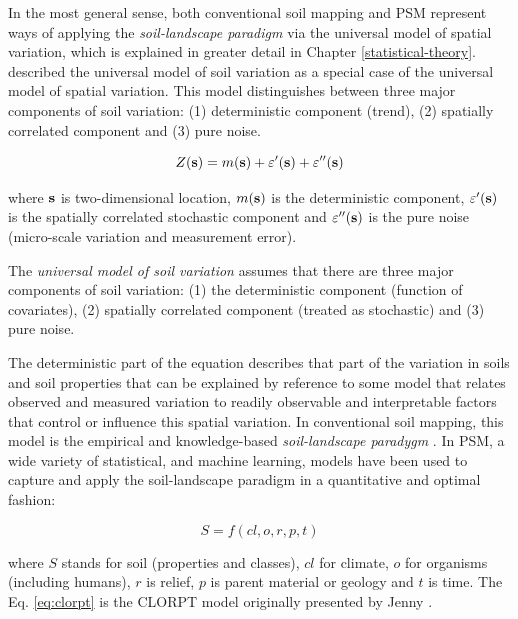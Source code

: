 \documentclass[11pt]{krantz}
\makeatletter
\newenvironment{kframe}{%
\medskip{}
\setlength{\fboxsep}{.8em}
 \def\at@end@of@kframe{}%
 \ifinner\ifhmode%
  \def\at@end@of@kframe{\end{minipage}}%
  \begin{minipage}{\columnwidth}%
 \fi\fi%
 \def\FrameCommand##1{\hskip\@totalleftmargin \hskip-\fboxsep
 \colorbox{shadecolor}{##1}\hskip-\fboxsep
     \hskip-\linewidth \hskip-\@totalleftmargin \hskip\columnwidth}%
 \MakeFramed {\advance\hsize-\width
   \@totalleftmargin\z@ \linewidth\hsize
   \@setminipage}}%
 {\par\unskip\endMakeFramed%
 \at@end@of@kframe}
\newenvironment{rmdblock}[1]
  {
  \begin{itemize}
  \renewcommand{\labelitemi}{
    \raisebox{-.7\height}[0pt][0pt]{
      {\setkeys{Gin}{width=3em,keepaspectratio}\texttt{[image: images/\#1]}}
    }
  }
  \setlength{\fboxsep}{1em}
  \begin{kframe}
  \item
  }
  {
  \end{kframe}
  \end{itemize}
  }
\newenvironment{rmdnote}
  {\begin{rmdblock}{note}}
  {\end{rmdblock}}
\theoremstyle{definition}
\theoremstyle{definition}
\theoremstyle{definition}
\theoremstyle{remark}
\makeatother
\begin{document}
In the most general sense, both conventional soil mapping and PSM
represent ways of applying the \emph{soil-landscape paradigm} via the
universal model of spatial variation, which is explained in greater
detail in Chapter \ref{statistical-theory}.
\citet[p.133]{Burrough1998OUP} described the universal model of soil
variation as a special case of the universal model of spatial variation.
This model distinguishes between three major components of soil
variation: (1) deterministic component (trend), (2) spatially correlated
component and (3) pure noise.

\begin{equation}
Z({\bf{s}}) = m({\bf{s}}) + \varepsilon '({\bf{s}}) + \varepsilon ''({\bf{s}})
\label{eq:univ-var}
\end{equation}

where \(\bf{s}\) is two-dimensional location, \(m({\bf{s}})\) is the
deterministic component, \(\varepsilon '({\bf{s}})\) is the spatially
correlated stochastic component and \(\varepsilon ''({\bf{s}})\) is the
pure noise (micro-scale variation and measurement error).

\begin{rmdnote}
The \emph{universal model of soil variation} assumes that there are
three major components of soil variation: (1) the deterministic
component (function of covariates), (2) spatially correlated component
(treated as stochastic) and (3) pure noise.
\end{rmdnote}

The deterministic part of the equation describes that part of the
variation in soils and soil properties that can be explained by
reference to some model that relates observed and measured variation to
readily observable and interpretable factors that control or influence
this spatial variation. In conventional soil mapping, this model is the
empirical and knowledge-based \emph{soil-landscape paradygm}
\citep{Hudson2000SSSAJ}. In PSM, a wide variety of statistical, and
machine learning, models have been used to capture and apply the
soil-landscape paradigm in a quantitative and optimal fashion:

\begin{equation}
S = f (cl, o, r, p, t)
\label{eq:clorpt}
\end{equation}

where \(S\) stands for soil (properties and classes), \(cl\) for
climate, \(o\) for organisms (including humans), \(r\) is relief, \(p\)
is parent material or geology and \(t\) is time. The Eq. \eqref{eq:clorpt}
is the CLORPT model originally presented by Jenny
\citeyearpar{jenny1994factors}.
\end{document}
